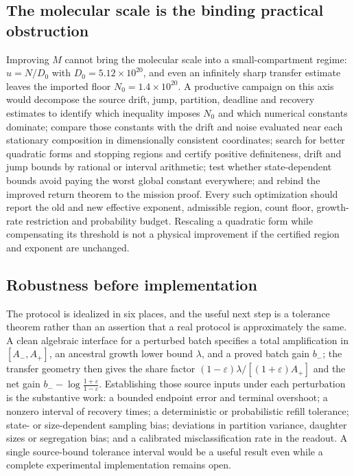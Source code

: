 \documentclass[11pt,a4paper]{article}
\theoremstyle{plain}
\theoremstyle{definition}
\theoremstyle{remark}
\newcommand{\eps}{\varepsilon}
\begin{document}
\subsection{The molecular scale is the binding practical obstruction}

Improving $M$ cannot bring the molecular scale into a small-compartment regime:
$u=N/D_0$ with $D_0=5.12\times10^{20}$, and even an infinitely sharp transfer
estimate leaves the imported floor $N_0=1.4\times10^{20}$. A productive
campaign on this axis would decompose the source drift, jump, partition,
deadline and recovery estimates to identify which inequality imposes $N_0$ and
which numerical constants dominate; compare those constants with the drift and
noise evaluated near each stationary composition in dimensionally consistent
coordinates; search for better quadratic forms and stopping regions and certify
positive definiteness, drift and jump bounds by rational or interval
arithmetic; test whether state-dependent bounds avoid paying the worst global
constant everywhere; and rebind the improved return theorem to the mission
proof. Every such optimization should report the old and new effective
exponent, admissible region, count floor, growth-rate restriction and
probability budget. Rescaling a quadratic form while compensating its threshold
is not a physical improvement if the certified region and exponent are
unchanged.

\subsection{Robustness before implementation}

The protocol is idealized in six places, and the useful next step is a
tolerance theorem rather than an assertion that a real protocol is
approximately the same. A clean algebraic interface for a perturbed batch
specifies a total amplification in $[A_-,A_+]$, an ancestral growth lower bound
$\lambda$, and a proved batch gain $b_-$; the transfer geometry then gives the
share factor $(1-\eps)\lambda/[(1+\eps)A_+]$ and the net gain
$b_--\log\frac{1+\eps}{1-\eps}$. Establishing those source inputs under each
perturbation is the substantive work: a bounded endpoint error and terminal
overshoot; a nonzero interval of recovery times; a deterministic or
probabilistic refill tolerance; state- or size-dependent sampling bias;
deviations in partition variance, daughter sizes or segregation bias; and a
calibrated misclassification rate in the readout. A single source-bound
tolerance interval would be a useful result even while a complete experimental
implementation remains open.
\end{document}
